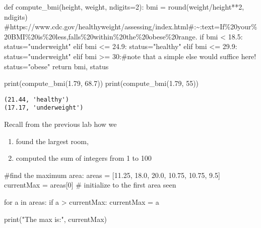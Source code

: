 \documentclass[
  letterpaper,
  DIV=11,
  numbers=noendperiod]{scrreprt}
\newenvironment{Shaded}{\begin{snugshade}}{\end{snugshade}}
\newcommand{\BuiltInTok}[1]{\textcolor[rgb]{0.00,0.23,0.31}{#1}}
\newcommand{\CommentTok}[1]{\textcolor[rgb]{0.37,0.37,0.37}{#1}}
\newcommand{\ControlFlowTok}[1]{\textcolor[rgb]{0.00,0.23,0.31}{#1}}
\newcommand{\DecValTok}[1]{\textcolor[rgb]{0.68,0.00,0.00}{#1}}
\newcommand{\FloatTok}[1]{\textcolor[rgb]{0.68,0.00,0.00}{#1}}
\newcommand{\KeywordTok}[1]{\textcolor[rgb]{0.00,0.23,0.31}{#1}}
\newcommand{\NormalTok}[1]{\textcolor[rgb]{0.00,0.23,0.31}{#1}}
\newcommand{\OperatorTok}[1]{\textcolor[rgb]{0.37,0.37,0.37}{#1}}
\newcommand{\StringTok}[1]{\textcolor[rgb]{0.13,0.47,0.30}{#1}}
\providecommand{\tightlist}{%
  \setlength{\itemsep}{0pt}\setlength{\parskip}{0pt}}\usepackage{longtable,booktabs,array}
\begin{document}
\begin{Shaded}
\begin{Highlighting}[]
\KeywordTok{def}\NormalTok{ compute\_bmi(height, weight, ndigits}\OperatorTok{=}\DecValTok{2}\NormalTok{):}
\NormalTok{    bmi }\OperatorTok{=} \BuiltInTok{round}\NormalTok{(weight}\OperatorTok{/}\NormalTok{height}\OperatorTok{**}\DecValTok{2}\NormalTok{, ndigits)}
    \CommentTok{\#https://www.cdc.gov/healthyweight/assessing/index.html\#:\textasciitilde{}:text=If\%20your\%20BMI\%20is\%20less,falls\%20within\%20the\%20obese\%20range.}
    \ControlFlowTok{if}\NormalTok{ bmi }\OperatorTok{\textless{}} \FloatTok{18.5}\NormalTok{:}
\NormalTok{        status}\OperatorTok{=}\StringTok{"underweight"}
    \ControlFlowTok{elif}\NormalTok{ bmi }\OperatorTok{\textless{}=} \FloatTok{24.9}\NormalTok{:}
\NormalTok{        status}\OperatorTok{=}\StringTok{"healthy"}
    \ControlFlowTok{elif}\NormalTok{ bmi }\OperatorTok{\textless{}=} \FloatTok{29.9}\NormalTok{:}
\NormalTok{        status}\OperatorTok{=}\StringTok{"underweight"}
    \ControlFlowTok{elif}\NormalTok{ bmi }\OperatorTok{\textgreater{}=} \DecValTok{30}\NormalTok{:}\CommentTok{\#note that a simple else would suffice here!}
\NormalTok{        status}\OperatorTok{=}\StringTok{"obese"}
    \ControlFlowTok{return}\NormalTok{ bmi, status}

\BuiltInTok{print}\NormalTok{(compute\_bmi(}\FloatTok{1.79}\NormalTok{, }\FloatTok{68.7}\NormalTok{))}
\BuiltInTok{print}\NormalTok{(compute\_bmi(}\FloatTok{1.79}\NormalTok{, }\DecValTok{55}\NormalTok{))}
\end{Highlighting}
\end{Shaded}

\begin{verbatim}
(21.44, 'healthy')
(17.17, 'underweight')
\end{verbatim}

Recall from the previous lab how we

\begin{enumerate}
\def\labelenumi{\arabic{enumi}.}
\tightlist
\item
  found the largest room,
\item
  computed the sum of integers from 1 to 100
\end{enumerate}

\begin{Shaded}
\begin{Highlighting}[]
\CommentTok{\#find the maximum area:}
\NormalTok{areas }\OperatorTok{=}\NormalTok{ [}\FloatTok{11.25}\NormalTok{, }\FloatTok{18.0}\NormalTok{, }\FloatTok{20.0}\NormalTok{, }\FloatTok{10.75}\NormalTok{, }\FloatTok{10.75}\NormalTok{, }\FloatTok{9.5}\NormalTok{]}
\NormalTok{currentMax }\OperatorTok{=}\NormalTok{ areas[}\DecValTok{0}\NormalTok{] }\CommentTok{\# initialize to the first area seen}

\ControlFlowTok{for}\NormalTok{ a }\KeywordTok{in}\NormalTok{ areas:}
  \ControlFlowTok{if}\NormalTok{ a }\OperatorTok{\textgreater{}}\NormalTok{ currentMax:}
\NormalTok{    currentMax }\OperatorTok{=}\NormalTok{ a}

\BuiltInTok{print}\NormalTok{(}\StringTok{"The max is:"}\NormalTok{, currentMax)}
\end{Highlighting}
\end{Shaded}
\end{document}
